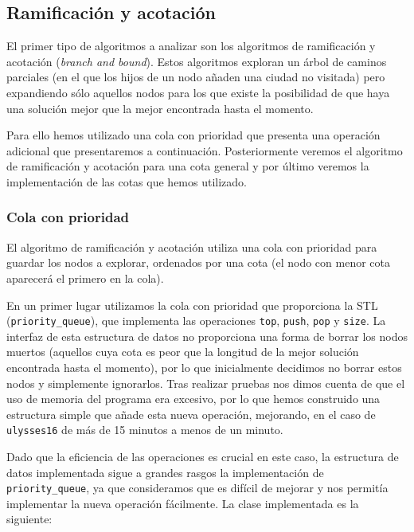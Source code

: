 \subsection{Ramificación y acotación}

El primer tipo de algoritmos a analizar son los algoritmos de ramificación y acotación
(\textit{branch and bound}). Estos algoritmos exploran un árbol de caminos parciales (en el que los hijos de un nodo añaden una ciudad no visitada) pero expandiendo sólo aquellos nodos para los que existe la posibilidad de que haya una solución mejor que la mejor
encontrada hasta el momento.

Para ello hemos utilizado una cola con prioridad que presenta una operación adicional
que presentaremos a continuación. Posteriormente veremos el algoritmo de ramificación
y acotación para una cota general y por último veremos la implementación de las cotas
que hemos utilizado.

\subsubsection{Cola con prioridad}

El algoritmo de ramificación y acotación utiliza una cola con prioridad para guardar
los nodos a explorar, ordenados por una cota (el nodo con menor cota aparecerá el
primero en la cola).

En un primer lugar utilizamos la cola con prioridad que proporciona la STL (\texttt{priority\_queue}), que implementa las operaciones \texttt{top}, \texttt{push}, \texttt{pop} y \texttt{size}. La interfaz de esta estructura de datos no proporciona una forma de borrar los nodos muertos (aquellos cuya cota es peor que la longitud de la mejor solución encontrada hasta el momento), por lo que inicialmente decidimos no borrar estos nodos y simplemente ignorarlos. Tras realizar pruebas nos dimos cuenta de que el
uso de memoria del programa era excesivo, por lo que hemos construido una estructura simple que añade esta nueva operación, mejorando, en el caso de \texttt{ulysses16} de más de 15 minutos a menos de un minuto.

Dado que la eficiencia de las operaciones es crucial en este caso, la estructura de datos implementada sigue a grandes rasgos la implementación de \texttt{priority\_queue}, ya que consideramos que es difícil de mejorar y nos permitía implementar la nueva operación fácilmente. La clase implementada es la siguiente:



